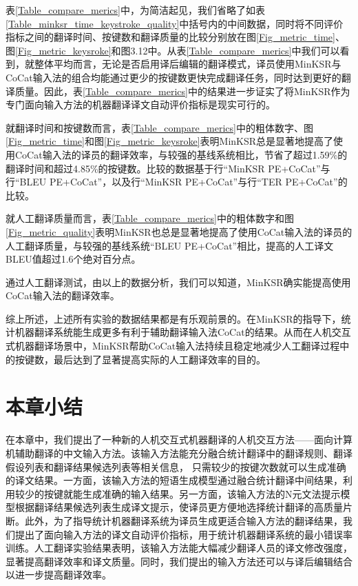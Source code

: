 表\ref{Table_compare_merics}中，为简洁起见，我们省略了如表\ref{Table_minksr_time_keystroke_quality}中括号内的中间数据，同时将不同评价指标之间的翻译时间、按键数和翻译质量的比较分别放在图\ref{Fig_metric_time}、图\ref{Fig_metric_keysroke}和图3.12中。从表\ref{Table_compare_merics}中我们可以看到，就整体平均而言，无论是否启用译后编辑的翻译模式，译员使用MinKSR与CoCat输入法的组合均能通过更少的按键数更快完成翻译任务，同时达到更好的翻译质量。因此，表\ref{Table_compare_merics}中的结果进一步证实了将MinKSR作为专门面向输入方法的机器翻译译文自动评价指标是现实可行的。

就翻译时间和按键数而言，表\ref{Table_compare_merics}中的粗体数字、图\ref{Fig_metric_time}和图\ref{Fig_metric_keysroke}表明MinKSR总是显著地提高了使用CoCat输入法的译员的翻译效率，与较强的基线系统相比，节省了超过1.59\%的翻译时间和超过4.85\%的按键数。比较的数据基于行“MinKSR PE+CoCat”与行“BLEU PE+CoCat”，以及行“MinKSR PE+CoCat”与行“TER PE+CoCat”的比较。

就人工翻译质量而言，表\ref{Table_compare_merics}中的粗体数字和图\ref{Fig_metric_quality}表明MinKSR也总是显著地提高了使用CoCat输入法的译员的人工翻译质量，与较强的基线系统“BLEU PE+CoCat”相比，提高的人工译文BLEU值超过1.6个绝对百分点。

通过人工翻译测试，由以上的数据分析，我们可以知道，MinKSR确实能提高使用CoCat输入法的翻译效率。

综上所述，上述所有实验的数据结果都是有乐观前景的。在MinKSR的指导下，统计机器翻译系统能生成更多有利于辅助翻译输入法CoCat的结果。从而在人机交互式机器翻译场景中，MinKSR帮助CoCat输入法持续且稳定地减少人工翻译过程中的按键数，最后达到了显著提高实际的人工翻译效率的目的。

\section{本章小结}

在本章中，我们提出了一种新的人机交互式机器翻译的人机交互方法——面向计算机辅助翻译的中文输入方法。该输入方法能充分融合统计翻译中的翻译规则、翻译假设列表和翻译结果候选列表等相关信息， 只需较少的按键次数就可以生成准确的译文结果。一方面，该输入方法的短语生成模型通过融合统计翻译中间结果，利用较少的按键就能生成准确的输入结果。另一方面，该输入方法的N元文法提示模型根据翻译结果候选列表生成译文提示，使译员更方便地选择统计翻译的高质量片断。此外，为了指导统计机器翻译系统为译员生成更适合输入方法的翻译结果，我们提出了面向输入方法的译文自动评价指标，用于统计机器翻译系统的最小错误率训练。人工翻译实验结果表明，该输入方法能大幅减少翻译人员的译文修改强度，显著提高翻译效率和译文质量。同时，我们提出的输入方法还可以与译后编辑结合以进一步提高翻译效率。